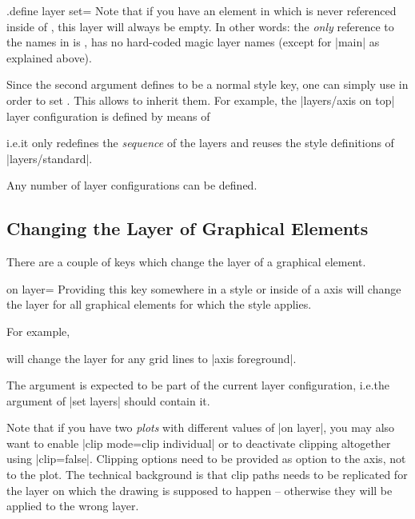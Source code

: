 \begin{handler}{{.define layer set}=}
    Note that if you have an element in  which is
    never referenced inside of , this layer will always
    be empty. In other words: the \emph{only} reference to the names in
     is , \PGFPlots{} has no
    hard-coded magic layer names (except for |main| as explained above).

    Since the second argument  defines  to be
    a normal style key, one can simply use  in order to set
    . This allows to inherit them. For example, the
    |layers/axis on top| layer configuration is defined by means of
\begin{codeexample}
\end{codeexample}
    \noindent i.e.\@ it only redefines the \emph{sequence} of the layers and
    reuses the style definitions of |layers/standard|.

    Any number of layer configurations can be defined.
\end{handler}


\subsection{Changing the Layer of Graphical Elements}

There are a couple of keys which change the layer of a graphical element.

\begin{pgfplotskey}{on layer=}
    Providing this key somewhere in a \PGFPlots{} style or inside of a
    \PGFPlots{} axis will change the layer for all graphical elements for which
    the style applies.

    For example,
    \noindent will change the layer for any grid lines to |axis foreground|.

    The argument  is expected to be part of the current layer
    configuration, i.e.\@ the argument of |set layers| should contain it.

    Note that if you have two \emph{plots} with different values of |on layer|,
    you may also want to enable |clip mode=clip individual| or to deactivate
    clipping altogether using |clip=false|. Clipping options need to be
    provided as option to the axis, not to the plot. The technical background
    is that clip paths needs to be replicated for the layer on which the
    drawing is supposed to happen -- otherwise they will be applied to the
    wrong layer.
\end{pgfplotskey}

